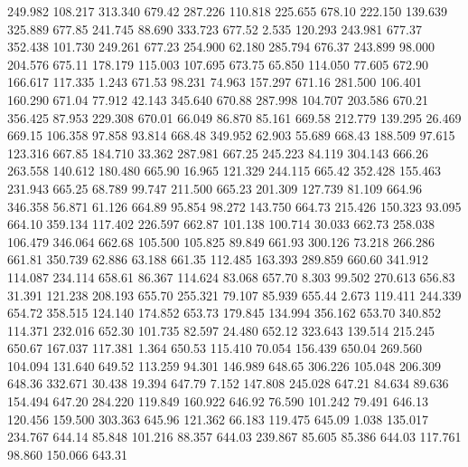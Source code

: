  249.982  108.217  313.340       679.42
 287.226  110.818  225.655       678.10
 222.150  139.639  325.889       677.85
 241.745   88.690  333.723       677.52
   2.535  120.293  243.981       677.37
 352.438  101.730  249.261       677.23
 254.900   62.180  285.794       676.37
 243.899   98.000  204.576       675.11
 178.179  115.003  107.695       673.75
  65.850  114.050   77.605       672.90
 166.617  117.335    1.243       671.53
  98.231   74.963  157.297       671.16
 281.500  106.401  160.290       671.04
  77.912   42.143  345.640       670.88
 287.998  104.707  203.586       670.21
 356.425   87.953  229.308       670.01
  66.049   86.870   85.161       669.58
 212.779  139.295   26.469       669.15
 106.358   97.858   93.814       668.48
 349.952   62.903   55.689       668.43
 188.509   97.615  123.316       667.85
 184.710   33.362  287.981       667.25
 245.223   84.119  304.143       666.26
 263.558  140.612  180.480       665.90
  16.965  121.329  244.115       665.42
 352.428  155.463  231.943       665.25
  68.789   99.747  211.500       665.23
 201.309  127.739   81.109       664.96
 346.358   56.871   61.126       664.89
  95.854   98.272  143.750       664.73
 215.426  150.323   93.095       664.10
 359.134  117.402  226.597       662.87
 101.138  100.714   30.033       662.73
 258.038  106.479  346.064       662.68
 105.500  105.825   89.849       661.93
 300.126   73.218  266.286       661.81
 350.739   62.886   63.188       661.35
 112.485  163.393  289.859       660.60
 341.912  114.087  234.114       658.61
  86.367  114.624   83.068       657.70
   8.303   99.502  270.613       656.83
  31.391  121.238  208.193       655.70
 255.321   79.107   85.939       655.44
   2.673  119.411  244.339       654.72
 358.515  124.140  174.852       653.73
 179.845  134.994  356.162       653.70
 340.852  114.371  232.016       652.30
 101.735   82.597   24.480       652.12
 323.643  139.514  215.245       650.67
 167.037  117.381    1.364       650.53
 115.410   70.054  156.439       650.04
 269.560  104.094  131.640       649.52
 113.259   94.301  146.989       648.65
 306.226  105.048  206.309       648.36
 332.671   30.438   19.394       647.79
   7.152  147.808  245.028       647.21
  84.634   89.636  154.494       647.20
 284.220  119.849  160.922       646.92
  76.590  101.242   79.491       646.13
 120.456  159.500  303.363       645.96
 121.362   66.183  119.475       645.09
   1.038  135.017  234.767       644.14
  85.848  101.216   88.357       644.03
 239.867   85.605   85.386       644.03
 117.761   98.860  150.066       643.31
